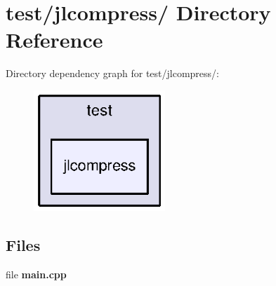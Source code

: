 \section{test/jlcompress/ Directory Reference}
\label{dir_6400e92c47901274762e47cd9907d20e}
Directory dependency graph for test/jlcompress/:
\nopagebreak
\begin{figure}[H]
\begin{center}
\leavevmode
\includegraphics[width=140pt]{dir_6400e92c47901274762e47cd9907d20e_dep}
\end{center}
\end{figure}
\subsection*{Files}
\begin{DoxyCompactItemize}
\item 
file {\bfseries main.cpp}
\end{DoxyCompactItemize}
